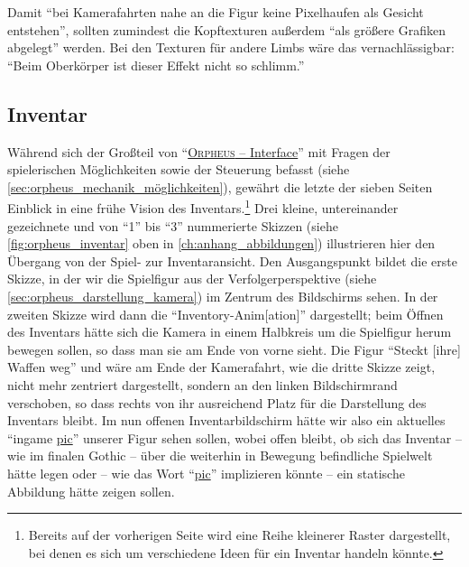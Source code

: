 \documentclass[a5paper,pagesize,numbers=noenddot]{scrbook}
\begin{document}
Damit \enquote{bei Kamerafahrten nahe an die Figur keine Pixelhaufen als Gesicht entstehen}, sollten zumindest die Kopftexturen außerdem \enquote{als größere Grafiken abgelegt} werden.
Bei den Texturen für andere Limbs wäre das vernachlässigbar: \enquote{Beim Oberkörper ist dieser Effekt nicht so schlimm.}


\subsection{Inventar}\label{sec:orpheus_darstellung_inventar}
Während sich der Großteil von \enquote{\uline{\textsc{Orpheus} -- Interface}} mit Fragen der spielerischen Möglichkeiten sowie der Steuerung befasst (siehe \autoref{sec:orpheus_mechanik_möglichkeiten}), gewährt die letzte der sieben Seiten Einblick in eine frühe Vision des Inventars.\footnote{Bereits auf der vorherigen Seite wird eine Reihe kleinerer Raster dargestellt, bei denen es sich um verschiedene Ideen für ein Inventar handeln könnte.}
Drei kleine, untereinander gezeichnete und von \enquote{1} bis \enquote{3} nummerierte Skizzen (siehe \autoref{fig:orpheus_inventar} oben in \autoref{ch:anhang_abbildungen}) illustrieren hier den Übergang von der Spiel- zur Inventar\-ansicht.
Den Ausgangspunkt bildet die erste Skizze, in der wir die Spielfigur aus der Verfolgerperspektive (siehe \autoref{sec:orpheus_darstellung_kamera}) im Zentrum des Bildschirms sehen.
In der zweiten Skizze wird dann die \enquote{Inventory-Anim[ation]} dargestellt; beim Öffnen des Inventars hätte sich die Kamera in einem Halbkreis um die Spielfigur herum bewegen sollen, so dass man sie am Ende von vorne sieht.
Die Figur \enquote{Steckt [ihre] Waffen weg} und wäre am Ende der Kamerafahrt, wie die dritte Skizze zeigt, nicht mehr zentriert dargestellt, sondern an den linken Bildschirmrand verschoben, so dass rechts von ihr ausreichend Platz für die Darstellung des Inventars bleibt.
Im nun offenen Inventarbildschirm hätte wir also ein aktuelles \enquote{ingame \uline{pic}} unserer Figur sehen sollen, wobei offen bleibt, ob sich das Inventar -- wie im finalen Gothic -- über die weiterhin in Bewegung befindliche Spielwelt hätte legen oder -- wie das Wort \enquote{\uline{pic}} implizieren könnte -- ein statische Abbildung hätte zeigen sollen.
\end{document}
